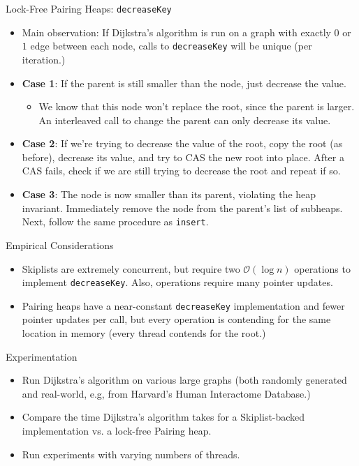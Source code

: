 \documentclass{beamer}
\begin{document}
\begin{frame}{Lock-Free Pairing Heaps: \texttt{decreaseKey}}
  \begin{itemize}
    \item Main observation: If Dijkstra's algorithm is run on a graph with
      exactly $0$ or $1$ edge between each node, calls to \texttt{decreaseKey}
      will be unique (per iteration.)
    \item \textbf{Case 1}: If the parent is still smaller than the node, just decrease the value.
      \begin{itemize}
        \item We know that this node won't replace the root, since the parent is larger.
          An interleaved call to change the parent can only decrease its value.
      \end{itemize}
    \item \textbf{Case 2}: If we're trying to decrease the value of the root, copy the root (as before),
      decrease its value, and try to CAS the new root into place. After a CAS fails, check if
      we are still trying to decrease the root and repeat if so.
    \item \textbf{Case 3}: The node is now smaller than its parent, violating the heap invariant. Immediately remove
      the node from the parent's list of subheaps. Next, follow the same procedure as \texttt{insert}.
  \end{itemize}
\end{frame}

\begin{frame}{Empirical Considerations}
  \begin{itemize}
    \item Skiplists are extremely concurrent, but require
      two $\mathcal{O}(\log n)$ operations to implement \texttt{decreaseKey}. Also,
      operations require many pointer updates.
    \item Pairing heaps have a near-constant \texttt{decreaseKey} implementation and fewer
      pointer updates per call, but
      every operation is contending for the same location in memory (every thread contends for the root.)
  \end{itemize}
\end{frame}

\begin{frame}{Experimentation}
  \begin{itemize}
    \item Run Dijkstra's algorithm on various large graphs
      (both randomly generated and real-world, e.g, from Harvard's Human Interactome Database.)
    \item Compare the time Dijkstra's algorithm takes for a Skiplist-backed implementation vs. a lock-free Pairing heap.
    \item Run experiments with varying numbers of threads.
  \end{itemize}
\end{frame}
\end{document}
